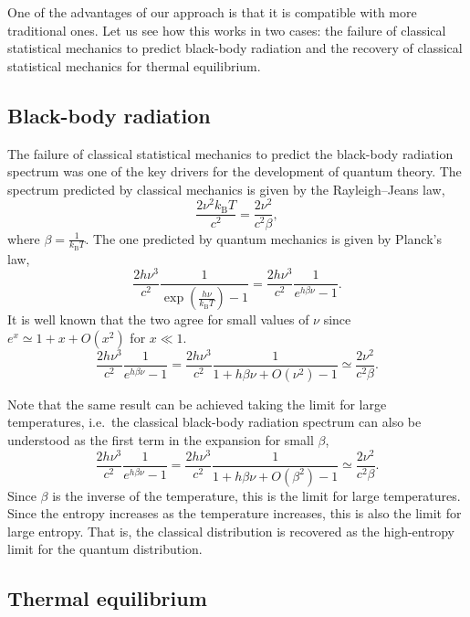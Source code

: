 \documentclass{SciPost}
\begin{document}
One of the advantages of our approach is that it is compatible with more traditional ones. Let us see how this works in two cases: the failure of classical statistical mechanics to predict black-body radiation and the recovery of classical statistical mechanics for thermal equilibrium.

\subsection{Black-body radiation}

The failure of classical statistical mechanics to predict the black-body radiation spectrum was one of the key drivers for the development of quantum theory. The spectrum predicted by classical mechanics is given by the Rayleigh–Jeans law,
\begin{equation}
	\frac{2 \nu^2 k_\text{B} T}{c^2} = \frac{2 \nu^2}{c^2 \beta},
\end{equation}
where $\beta = \frac{1}{k_\text{B} T}$. The one predicted by quantum mechanics is given by Planck's law,
\begin{equation}
	\frac{ 2 h \nu^3}{c^2} \frac 1{\exp\left(\frac{h\nu}{k_\mathrm B T}\right) - 1} = \frac{ 2 h \nu^3}{c^2} \frac 1{e^{h \beta \nu} - 1}.
\end{equation}
It is well known that the two agree for small values of $\nu$ since $e^x \simeq 1 + x + O(x^2)$ for $x\ll 1$.
\begin{equation}
	\frac{ 2 h \nu^3}{c^2} \frac 1{e^{h \beta \nu} - 1} = \frac{ 2 h \nu^3}{c^2} \frac 1{1 + h \beta \nu + O\left(\nu^2\right) - 1} \simeq \frac{2 \nu^2}{c^2 \beta}.
\end{equation}

Note that the same result can be achieved taking the limit for large temperatures, i.e.~the classical black-body radiation spectrum can also be understood as the first term in the expansion for small $\beta$,
\begin{equation}
	\frac{ 2 h \nu^3}{c^2} \frac 1{e^{h \beta \nu} - 1} = \frac{ 2 h \nu^3}{c^2} \frac 1{1 + h \beta \nu + O\left(\beta^2\right) - 1} \simeq \frac{2 \nu^2}{c^2 \beta}.
\end{equation}
Since $\beta$ is the inverse of the temperature, this is the limit for large temperatures. Since the entropy increases as the temperature increases, this is also the limit for large entropy. That is, the classical distribution is recovered as the high-entropy limit for the quantum distribution.

\subsection{Thermal equilibrium}
\end{document}
